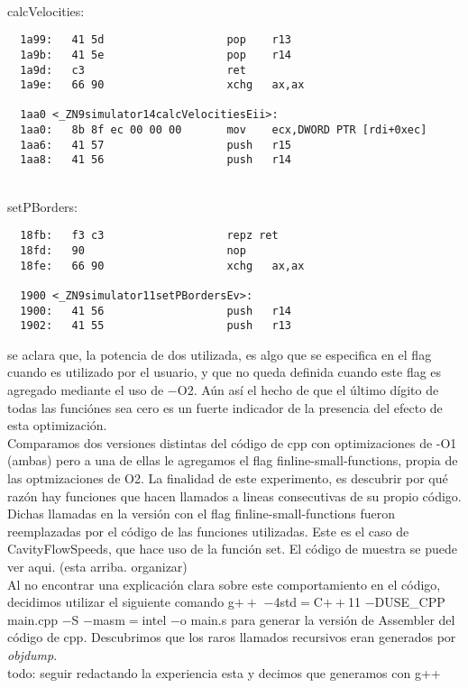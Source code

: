 ~\\
calcVelocities:
\begin{verbatim}
  1a99:   41 5d                   pop    r13
  1a9b:   41 5e                   pop    r14
  1a9d:   c3                      ret    
  1a9e:   66 90                   xchg   ax,ax

  1aa0 <_ZN9simulator14calcVelocitiesEii>:
  1aa0:   8b 8f ec 00 00 00       mov    ecx,DWORD PTR [rdi+0xec]
  1aa6:   41 57                   push   r15
  1aa8:   41 56                   push   r14
\end{verbatim}
~\\
setPBorders:
\begin{verbatim}
  18fb:   f3 c3                   repz ret 
  18fd:   90                      nop
  18fe:   66 90                   xchg   ax,ax

  1900 <_ZN9simulator11setPBordersEv>:
  1900:   41 56                   push   r14
  1902:   41 55                   push   r13
\end{verbatim}


se aclara que, la potencia de dos utilizada, es algo que se especifica en el flag cuando es utilizado por el usuario, y que no queda definida cuando este flag es agregado mediante el uso de $-$O2. Aún así el hecho de que el último dígito de todas las funciónes sea cero es un fuerte indicador de la presencia del efecto de esta optimización.\\
Comparamos dos versiones distintas del código de cpp con optimizaciones de -O1 (ambas) pero a una de ellas le agregamos el flag finline-small-functions, propia de las optmizaciones de O2. La finalidad de este experimento, es descubrir por qué razón hay funciones que hacen llamados a lineas consecutivas de su propio código.\\
Dichas llamadas en la versión con el flag finline-small-functions fueron reemplazadas por el código de las funciones utilizadas. Este es el caso de CavityFlowSpeeds, que hace uso de la función set. El código de muestra se puede ver aqui. (esta arriba. organizar)
\\
Al no encontrar una explicación clara sobre este comportamiento en el código, decidimos utilizar el siguiente comando g$++$ $-$4std$=$C$++$11 $-$DUSE\_CPP main.cpp  $-$S $-$masm$=$intel $-$o main.s para generar la versión de Assembler del código de cpp. Descubrimos que los raros llamados recursivos eran generados por \textit{objdump}.
\\
todo: seguir redactando la experiencia esta
y decimos que generamos con g++
~\\


